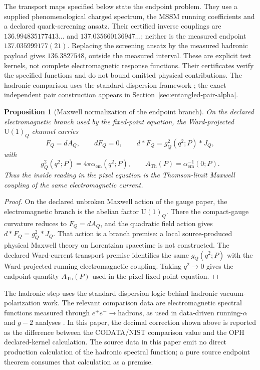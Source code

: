 \documentclass[11pt]{article}
\newtheorem{proposition}{Proposition}
\theoremstyle{remark}
\newcommand{\U}{\mathrm{U}}
\newcommand{\ATh}{A_{\mathrm{Th}}}
\begin{document}
The transport maps specified below state the endpoint problem.
They use a supplied phenomenological charged spectrum, the MSSM running
coefficients and a declared quark-screening ansatz. Their certified inverse
couplings are $136.994835177413\ldots$ and $137.035660136947\ldots$; neither
is the measured endpoint $137.035999177(21)$. Replacing the screening ansatz
by the measured hadronic payload gives $136.3827548$, outside the measured
interval. These are explicit test kernels, not complete electromagnetic
response functions. Their certificates verify the
specified functions and do not bound omitted physical contributions.
The hadronic comparison uses the standard dispersion framework
\cite{dhmz,knt19,pdg-xsect}; the exact independent pair construction appears
in Section~\ref{sec:entangled-pair-alpha}.

\begin{proposition}[Maxwell normalization of the endpoint branch]
On the declared electromagnetic branch used by the fixed-point equation, the Ward-projected
\(\U(1)_Q\) channel carries
\[
F_Q=dA_Q,\qquad dF_Q=0,\qquad d{*}F_Q=g_Q^2(q^2;P){*}J_Q,
\]
with
\[
g_Q^2(q^2;P)=4\pi\alpha_{\mathrm{em}}(q^2;P),
\qquad
\ATh(P)=\alpha_{\mathrm{em}}^{-1}(0;P).
\]
Thus the inside reading in the pixel equation is the Thomson-limit Maxwell coupling of the same
electromagnetic current.
\end{proposition}

\begin{proof}
On the declared unbroken Maxwell action of the gauge paper, the electromagnetic branch is the
abelian factor \(\U(1)_Q\). There the compact-gauge curvature reduces to \(F_Q=dA_Q\), and the
quadratic field action gives \(d{*}F_Q=g_Q^2{*}J_Q\). That action is a branch premise: a local
source-produced physical Maxwell theory on Lorentzian spacetime is not constructed. The declared Ward-current transport premise identifies
the same \(g_Q(q^2;P)\) with the Ward-projected running electromagnetic coupling. Taking
\(q^2\to0\) gives the endpoint quantity \(\ATh(P)\) used in the pixel fixed-point equation.
\end{proof}

The hadronic step uses the standard dispersion logic behind hadronic vacuum-polarization work. The relevant comparison data are electromagnetic spectral functions measured through \(e^+e^-\to\mathrm{hadrons}\), as used in data-driven running-\(\alpha\) and \(g-2\) analyses \cite{dhmz,knt19,pdg-xsect}. In this paper, the decimal correction shown above is reported as the difference between the CODATA/NIST comparison value and the OPH declared-kernel calculation. The source data in this paper emit no direct production calculation of the hadronic spectral function; a pure source endpoint theorem consumes that calculation as a premise.
\end{document}
